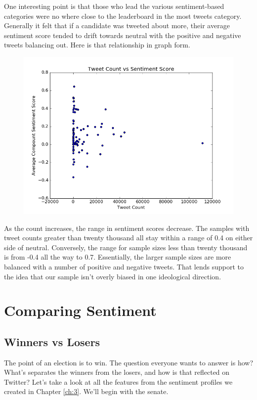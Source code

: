 \documentclass[11pt, twoside, reqno]{article}
\begin{document}
One interesting point is that those who lead the various sentiment-based categories were no where close to the leaderboard in the most tweets category. Generally it felt that if a candidate was tweeted about more, their average sentiment score tended to drift towards neutral with the positive and negative tweets balancing out. Here is that relationship in graph form. 
\begin{figure}[H]
\centering
	\includegraphics[scale=0.5]{count_sentiment}
\end{figure}
As the count increases, the range in sentiment scores decrease. The samples with tweet counts greater than twenty thousand all stay within a range of 0.4 on either side of neutral. Conversely, the range for sample sizes less than twenty thousand is from -0.4 all the way to 0.7. Essentially, the larger sample sizes are more balanced with a number of positive and negative tweets. That lends support to the idea that our sample isn't overly biased in one ideological direction. 
\section{Comparing Sentiment}

\subsection{Winners vs Losers}
\hspace{0.2in}The point of an election is to win. The question everyone wants to answer is how? What's separates the winners from the losers, and how is that reflected on Twitter? Let's take a look at all the features from the sentiment profiles we created in Chapter \ref{ch:3}. We'll begin with the senate. 
\end{document}
